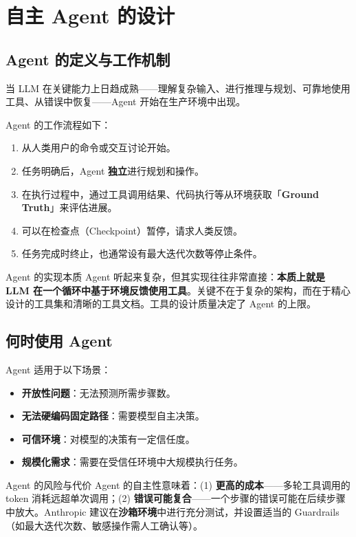 \section{自主 Agent 的设计}

\subsection{Agent 的定义与工作机制}

当 LLM 在关键能力上日趋成熟——理解复杂输入、进行推理与规划、可靠地使用工具、从错误中恢复——Agent 开始在生产环境中出现。

Agent 的工作流程如下：
\begin{enumerate}
    \item 从人类用户的命令或交互讨论开始。
    \item 任务明确后，Agent \textbf{独立}进行规划和操作。
    \item 在执行过程中，通过工具调用结果、代码执行等从环境获取「\textbf{Ground Truth}」来评估进展。
    \item 可以在检查点（Checkpoint）暂停，请求人类反馈。
    \item 任务完成时终止，也通常设有最大迭代次数等停止条件。
\end{enumerate}

\begin{importantbox}{Agent 的实现本质}
Agent 听起来复杂，但其实现往往非常直接：\textbf{本质上就是 LLM 在一个循环中基于环境反馈使用工具}。关键不在于复杂的架构，而在于精心设计的工具集和清晰的工具文档。工具的设计质量决定了 Agent 的上限。
\end{importantbox}

\subsection{何时使用 Agent}

Agent 适用于以下场景：
\begin{itemize}
    \item \textbf{开放性问题}：无法预测所需步骤数。
    \item \textbf{无法硬编码固定路径}：需要模型自主决策。
    \item \textbf{可信环境}：对模型的决策有一定信任度。
    \item \textbf{规模化需求}：需要在受信任环境中大规模执行任务。
\end{itemize}

\begin{warningbox}{Agent 的风险与代价}
Agent 的自主性意味着：(1) \textbf{更高的成本}——多轮工具调用的 token 消耗远超单次调用；(2) \textbf{错误可能复合}——一个步骤的错误可能在后续步骤中放大。Anthropic 建议在\textbf{沙箱环境}中进行充分测试，并设置适当的 Guardrails（如最大迭代次数、敏感操作需人工确认等）。
\end{warningbox}

